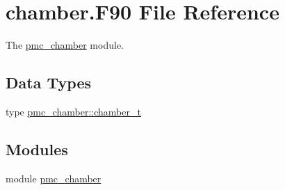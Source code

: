 \hypertarget{chamber_8_f90}{}\section{chamber.\+F90 File Reference}
\label{chamber_8_f90}


The \mbox{\hyperlink{namespacepmc__chamber}{pmc\+\_\+chamber}} module.  


\subsection*{Data Types}
\begin{DoxyCompactItemize}
\item 
type \mbox{\hyperlink{structpmc__chamber_1_1chamber__t}{pmc\+\_\+chamber\+::chamber\+\_\+t}}
\end{DoxyCompactItemize}
\subsection*{Modules}
\begin{DoxyCompactItemize}
\item 
module \mbox{\hyperlink{namespacepmc__chamber}{pmc\+\_\+chamber}}
\end{DoxyCompactItemize}
